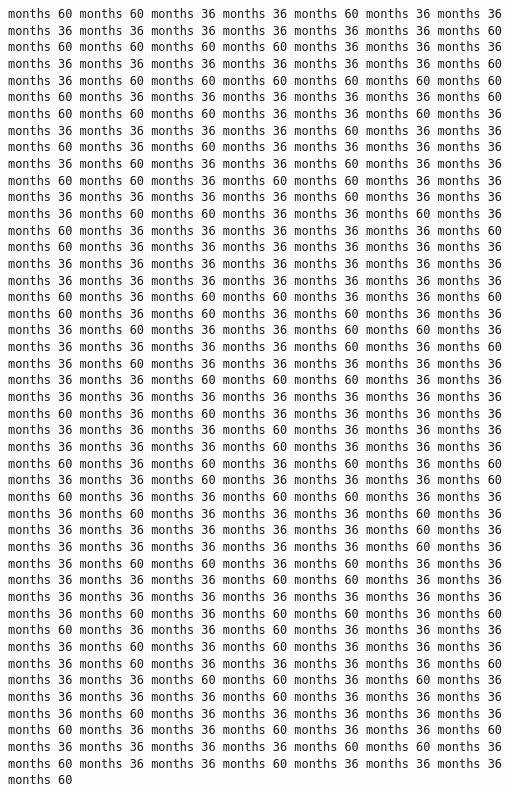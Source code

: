 \documentclass[11pt]{article}
\begin{document}
\begin{Verbatim}[commandchars=\\\{\}, frame=single, framerule=2mm, rulecolor=\color{outerrorbackground}]
months 60 months 60 months 36 months 36 months 60 months 36 months 36 months 36 months 36 months 36 months 36 months 36 months 36 months 60 months 60 months 60 months 60 months 60 months 36 months 36 months 36 months 36 months 36 months 36 months 36 months 36 months 36 months 60 months 36 months 60 months 60 months 60 months 60 months 60 months 60 months 60 months 36 months 36 months 36 months 36 months 36 months 60 months 60 months 60 months 60 months 36 months 36 months 60 months 36 months 36 months 36 months 36 months 36 months 60 months 36 months 36 months 60 months 36 months 60 months 36 months 36 months 36 months 36 months 36 months 60 months 36 months 36 months 60 months 36 months 36 months 60 months 60 months 36 months 60 months 60 months 36 months 36 months 36 months 36 months 36 months 36 months 60 months 36 months 36 months 36 months 60 months 60 months 36 months 36 months 60 months 36 months 60 months 36 months 36 months 36 months 36 months 36 months 60 months 60 months 36 months 36 months 36 months 36 months 36 months 36 months 36 months 36 months 36 months 36 months 36 months 36 months 36 months 36 months 36 months 36 months 36 months 36 months 36 months 36 months 60 months 36 months 60 months 60 months 36 months 36 months 60 months 60 months 36 months 60 months 36 months 60 months 36 months 36 months 36 months 60 months 36 months 36 months 60 months 60 months 36 months 36 months 36 months 36 months 36 months 60 months 36 months 60 months 36 months 60 months 36 months 36 months 36 months 36 months 36 months 36 months 36 months 60 months 60 months 60 months 36 months 36 months 36 months 36 months 36 months 36 months 36 months 36 months 36 months 60 months 36 months 60 months 36 months 36 months 36 months 36 months 36 months 36 months 36 months 60 months 36 months 36 months 36 months 36 months 36 months 36 months 60 months 36 months 36 months 36 months 60 months 36 months 60 months 36 months 60 months 36 months 60 months 36 months 36 months 60 months 36 months 36 months 36 months 60 months 60 months 36 months 36 months 60 months 60 months 36 months 36 months 36 months 60 months 36 months 36 months 36 months 60 months 36 months 36 months 36 months 36 months 36 months 36 months 60 months 36 months 36 months 36 months 36 months 36 months 36 months 60 months 36 months 36 months 60 months 60 months 36 months 60 months 36 months 36 months 36 months 36 months 36 months 60 months 60 months 36 months 36 months 36 months 36 months 36 months 36 months 36 months 36 months 36 months 36 months 60 months 36 months 60 months 60 months 36 months 60 months 60 months 36 months 36 months 60 months 36 months 36 months 36 months 36 months 60 months 36 months 60 months 36 months 36 months 36 months 36 months 60 months 36 months 36 months 36 months 36 months 60 months 36 months 36 months 60 months 60 months 36 months 60 months 36 months 36 months 36 months 36 months 60 months 36 months 36 months 36 months 36 months 60 months 36 months 36 months 36 months 36 months 36 months 60 months 36 months 36 months 60 months 36 months 36 months 60 months 36 months 36 months 36 months 36 months 60 months 60 months 36 months 60 months 36 months 36 months 60 months 36 months 36 months 36 months 60 
\end{Verbatim}
\end{document}
